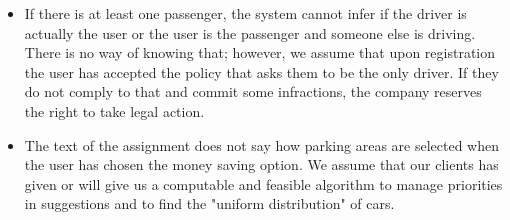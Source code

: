 \begin{itemize}
				\item If there is at least one passenger, the system cannot infer if the driver is actually the user or the user is the passenger and someone else is driving. There is no way of knowing that; however, we assume that upon registration the user has accepted the policy that asks them to be the only driver. If they do not comply to that and commit some infractions, the company reserves the right to take legal action. 
				
				\item The text of the assignment does not say how parking areas are selected when the user has chosen the money saving option. We assume that our clients has given or will give us a computable and feasible algorithm to manage priorities in suggestions and to find the "uniform distribution" of cars. 

			\end{itemize}